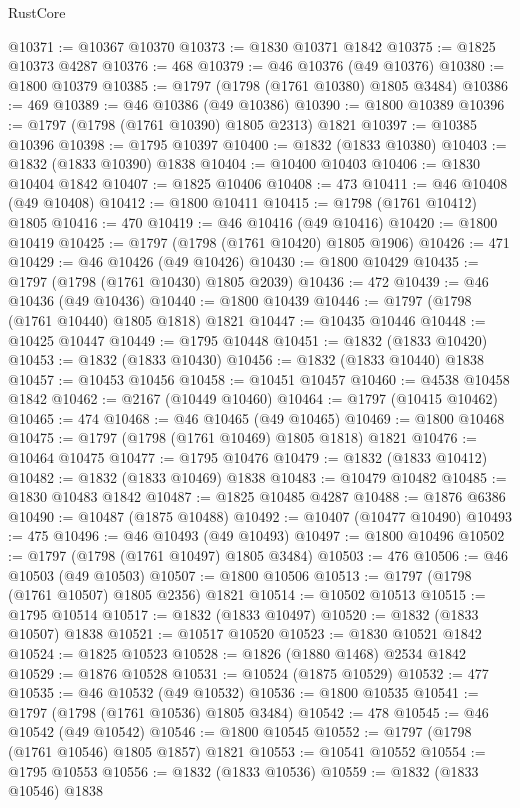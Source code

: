 \begin{lexlean}{RustCore}
\begin{coremodule}
@10371 := @10367 @10370
@10373 := @1830 @10371 @1842
@10375 := @1825 @10373 @4287
@10376 := 468
@10379 := @46 @10376 (@49 @10376)
@10380 := @1800 @10379
@10385 := @1797 (@1798 (@1761 @10380) @1805 @3484)
@10386 := 469
@10389 := @46 @10386 (@49 @10386)
@10390 := @1800 @10389
@10396 := @1797 (@1798 (@1761 @10390) @1805 @2313) @1821
@10397 := @10385 @10396
@10398 := @1795 @10397
@10400 := @1832 (@1833 @10380)
@10403 := @1832 (@1833 @10390) @1838
@10404 := @10400 @10403
@10406 := @1830 @10404 @1842
@10407 := @1825 @10406
@10408 := 473
@10411 := @46 @10408 (@49 @10408)
@10412 := @1800 @10411
@10415 := @1798 (@1761 @10412) @1805
@10416 := 470
@10419 := @46 @10416 (@49 @10416)
@10420 := @1800 @10419
@10425 := @1797 (@1798 (@1761 @10420) @1805 @1906)
@10426 := 471
@10429 := @46 @10426 (@49 @10426)
@10430 := @1800 @10429
@10435 := @1797 (@1798 (@1761 @10430) @1805 @2039)
@10436 := 472
@10439 := @46 @10436 (@49 @10436)
@10440 := @1800 @10439
@10446 := @1797 (@1798 (@1761 @10440) @1805 @1818) @1821
@10447 := @10435 @10446
@10448 := @10425 @10447
@10449 := @1795 @10448
@10451 := @1832 (@1833 @10420)
@10453 := @1832 (@1833 @10430)
@10456 := @1832 (@1833 @10440) @1838
@10457 := @10453 @10456
@10458 := @10451 @10457
@10460 := @4538 @10458 @1842
@10462 := @2167 (@10449 @10460)
@10464 := @1797 (@10415 @10462)
@10465 := 474
@10468 := @46 @10465 (@49 @10465)
@10469 := @1800 @10468
@10475 := @1797 (@1798 (@1761 @10469) @1805 @1818) @1821
@10476 := @10464 @10475
@10477 := @1795 @10476
@10479 := @1832 (@1833 @10412)
@10482 := @1832 (@1833 @10469) @1838
@10483 := @10479 @10482
@10485 := @1830 @10483 @1842
@10487 := @1825 @10485 @4287
@10488 := @1876 @6386
@10490 := @10487 (@1875 @10488)
@10492 := @10407 (@10477 @10490)
@10493 := 475
@10496 := @46 @10493 (@49 @10493)
@10497 := @1800 @10496
@10502 := @1797 (@1798 (@1761 @10497) @1805 @3484)
@10503 := 476
@10506 := @46 @10503 (@49 @10503)
@10507 := @1800 @10506
@10513 := @1797 (@1798 (@1761 @10507) @1805 @2356) @1821
@10514 := @10502 @10513
@10515 := @1795 @10514
@10517 := @1832 (@1833 @10497)
@10520 := @1832 (@1833 @10507) @1838
@10521 := @10517 @10520
@10523 := @1830 @10521 @1842
@10524 := @1825 @10523
@10528 := @1826 (@1880 @1468) @2534 @1842
@10529 := @1876 @10528
@10531 := @10524 (@1875 @10529)
@10532 := 477
@10535 := @46 @10532 (@49 @10532)
@10536 := @1800 @10535
@10541 := @1797 (@1798 (@1761 @10536) @1805 @3484)
@10542 := 478
@10545 := @46 @10542 (@49 @10542)
@10546 := @1800 @10545
@10552 := @1797 (@1798 (@1761 @10546) @1805 @1857) @1821
@10553 := @10541 @10552
@10554 := @1795 @10553
@10556 := @1832 (@1833 @10536)
@10559 := @1832 (@1833 @10546) @1838

\end{coremodule}
\end{lexlean}
